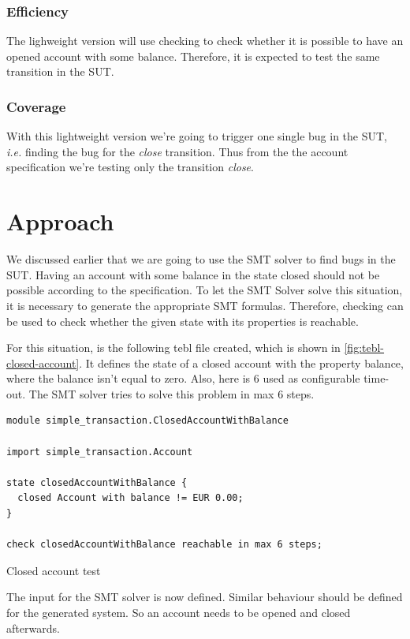 \subsubsection{Efficiency}
The lighweight version will use checking to check whether it is possible to have
an opened account with some balance. Therefore, it is expected to test the same
transition in the SUT.

\subsubsection{Coverage}
With this lightweight version we're going to trigger one single bug in the SUT,
\textit{i.e.} finding the bug for the \textit{close} transition. Thus from the
the account specification we're testing only the transition \textit{close}.

\section{Approach}

We discussed earlier that we are going to use the SMT solver to find bugs in the
SUT. Having an account with some balance in the state closed should not be possible
according to the specification. To let the SMT Solver solve this situation, it
is necessary to generate the appropriate SMT formulas. Therefore, checking can
be used to check whether the given state with its properties is reachable.

For this situation, is the following tebl file created, which is shown in
\autoref{fig:tebl-closed-account}. It defines the state of a closed account with
the property balance, where the balance isn't equal to zero. Also, here is 6
used as configurable time-out. The SMT solver tries to solve this problem in
max 6 steps.

\begin{sourcecode}[h!]
\begin{lstlisting}[]
module simple_transaction.ClosedAccountWithBalance

import simple_transaction.Account

state closedAccountWithBalance {
  closed Account with balance != EUR 0.00;
}

check closedAccountWithBalance reachable in max 6 steps;
\end{lstlisting}
\caption{Closed account test}\label{fig:tebl-closed-account}
\end{sourcecode}
\FloatBarrier

The input for the SMT solver is now defined. Similar behaviour should be defined
for the generated system. So an account needs to be opened and closed
afterwards.

